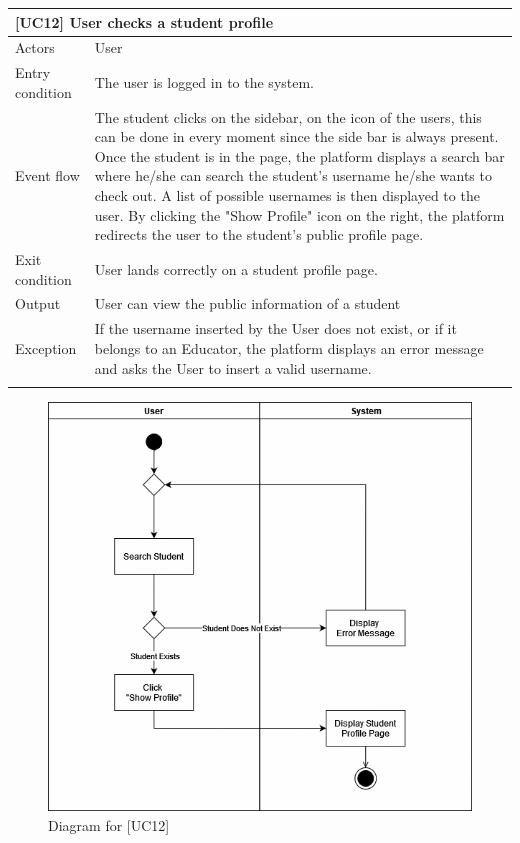 \documentclass[12pt,oneside,a4paper]{article}
\begin{document}
\begin{table}[htbp]
\begin{tabular}{|l|p{12cm}|}
    \hline
    \multicolumn{2}{|l|}{\textbf{[UC12] User checks a student profile}}\\
    \hline
    Actors & User\\
    \hline
    Entry condition & The user is logged in to the system.\\
    \hline
    Event flow & The student clicks on the sidebar, on the icon of the users, this can be done in every moment since the side bar is always present. Once the student is in the page, the platform displays a search bar where he/she can search the student's username he/she wants to check out. A list of possible usernames is then displayed to the user. By clicking the "Show Profile" icon on the right, the platform redirects the user to the student's public profile page.\\
    \hline
    Exit condition & User lands correctly on a student profile page.\\
    \hline
    Output & User can view the public information of a student\\
    \hline
    Exception & If the username inserted by the User does not exist, or if it belongs to an Educator, the platform displays an error message and asks the User to insert a valid username.\\
    \lasthline
\end{tabular}
\end{table}

\clearpage

\begin{figure}[htbp]
    \centering
    \includegraphics[width=1\linewidth]{Images/Diagrams/CheckProfile.png}
    \caption{Diagram for [UC12]}
    \label{fig:enter-label}
\end{figure}
\end{document}
